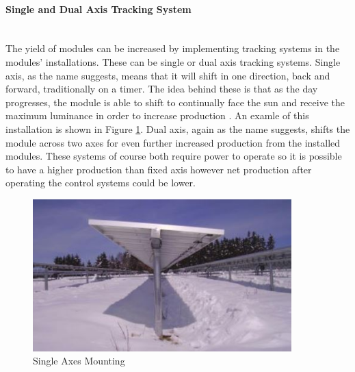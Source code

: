 \paragraph{Single and Dual Axis Tracking System}
~\\
The yield of modules can be increased by implementing tracking systems in the modules' installations. These can be single or dual axis tracking systems. Single axis, as the name suggests, means that it will shift in one direction, back and forward, traditionally on a timer. The idea behind these is that as the day progresses, the module is able to shift to continually face the sun and receive the maximum luminance in order to increase production \cite{Haberlin2012}. An examle of this installation is shown in Figure \ref{fig:pv-mounting-single-axis}. Dual axis, again as the name suggests, shifts the module across two axes for even further increased production from the installed modules. These systems of course both require power to operate so it is possible to have a higher production than fixed axis however net production after operating the control systems could be lower.  

\begin{figure}[H]
	\hfill\includegraphics[width = 100mm]{images/pv-mouting-rotating}\hspace*{\fill}
	\caption{Single Axes Mounting \cite{Haberlin2012}} 
	\label{fig:pv-mounting-single-axis}
\end{figure} 
       
  
 